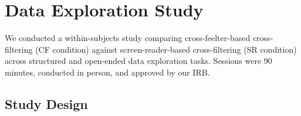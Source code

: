 \documentclass[12pt]{cmuthesis}
\begin{document}



\section{Data Exploration Study}
\label{sec:study}

We conducted a within-subjects study comparing cross-feelter-based cross-filtering (CF condition) against screen-reader-based cross-filtering (SR condition) across structured and open-ended data exploration tasks. Sessions were 90 minutes, conducted in person, and approved by our IRB.

 
\subsection{Study Design} 
\end{document}
